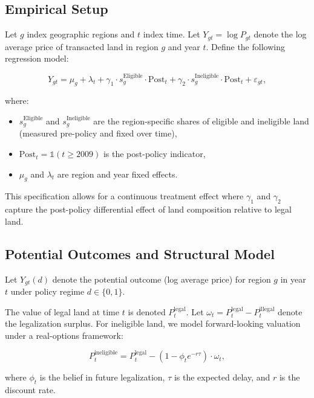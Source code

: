 \documentclass[12pt]{article}
\begin{document}
\subsection*{Empirical Setup}

Let $g$ index geographic regions and $t$ index time. Let $Y_{gt} = \log P_{gt}$ denote the log average price of transacted land in region $g$ and year $t$. Define the following regression model:

\begin{equation}
\label{eq:did_regression}
Y_{gt} = \mu_g + \lambda_t + \gamma_1 \cdot s_g^{\text{Eligible}} \cdot \text{Post}_t + \gamma_2 \cdot s_g^{\text{Ineligible}} \cdot \text{Post}_t + \varepsilon_{gt},
\end{equation}

where:
\begin{itemize}
  \item $s_g^{\text{Eligible}}$ and $s_g^{\text{Ineligible}}$ are the region-specific shares of eligible and ineligible land (measured pre-policy and fixed over time),
  \item $\text{Post}_t = \mathbb{1}(t \geq 2009)$ is the post-policy indicator,
  \item $\mu_g$ and $\lambda_t$ are region and year fixed effects.
\end{itemize}

This specification allows for a continuous treatment effect where $\gamma_1$ and $\gamma_2$ capture the post-policy differential effect of land composition relative to legal land.

\subsection*{Potential Outcomes and Structural Model}

Let $Y_{gt}(d)$ denote the potential outcome (log average price) for region $g$ in year $t$ under policy regime $d \in \{0,1\}$.

The value of legal land at time $t$ is denoted $P_t^{\text{legal}}$. Let $\omega_t = P_t^{\text{legal}} - P_t^{\text{illegal}}$ denote the legalization surplus. For ineligible land, we model forward-looking valuation under a real-options framework:

\[
P_t^{\text{ineligible}} = P_t^{\text{legal}} - (1 - \phi_t e^{-r\tau}) \cdot \omega_t,
\]

where $\phi_t$ is the belief in future legalization, $\tau$ is the expected delay, and $r$ is the discount rate.
\end{document}
